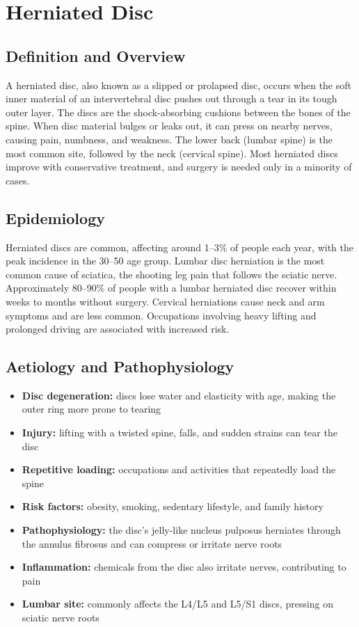 \chapter{Herniated Disc}

\section*{Definition and Overview}
A herniated disc, also known as a slipped or prolapsed disc, occurs when the soft inner material of an intervertebral disc pushes out through a tear in its tough outer layer. The discs are the shock-absorbing cushions between the bones of the spine. When disc material bulges or leaks out, it can press on nearby nerves, causing pain, numbness, and weakness. The lower back (lumbar spine) is the most common site, followed by the neck (cervical spine). Most herniated discs improve with conservative treatment, and surgery is needed only in a minority of cases.

\section*{Epidemiology}
Herniated discs are common, affecting around 1--3\% of people each year, with the peak incidence in the 30--50 age group. Lumbar disc herniation is the most common cause of sciatica, the shooting leg pain that follows the sciatic nerve. Approximately 80--90\% of people with a lumbar herniated disc recover within weeks to months without surgery. Cervical herniations cause neck and arm symptoms and are less common. Occupations involving heavy lifting and prolonged driving are associated with increased risk.

\section*{Aetiology and Pathophysiology}
\begin{itemize}
    \item \textbf{Disc degeneration:} discs lose water and elasticity with age, making the outer ring more prone to tearing
    \item \textbf{Injury:} lifting with a twisted spine, falls, and sudden strains can tear the disc
    \item \textbf{Repetitive loading:} occupations and activities that repeatedly load the spine
    \item \textbf{Risk factors:} obesity, smoking, sedentary lifestyle, and family history
    \item \textbf{Pathophysiology:} the disc's jelly-like nucleus pulposus herniates through the annulus fibrosus and can compress or irritate nerve roots
    \item \textbf{Inflammation:} chemicals from the disc also irritate nerves, contributing to pain
    \item \textbf{Lumbar site:} commonly affects the L4/L5 and L5/S1 discs, pressing on sciatic nerve roots
\end{itemize}

